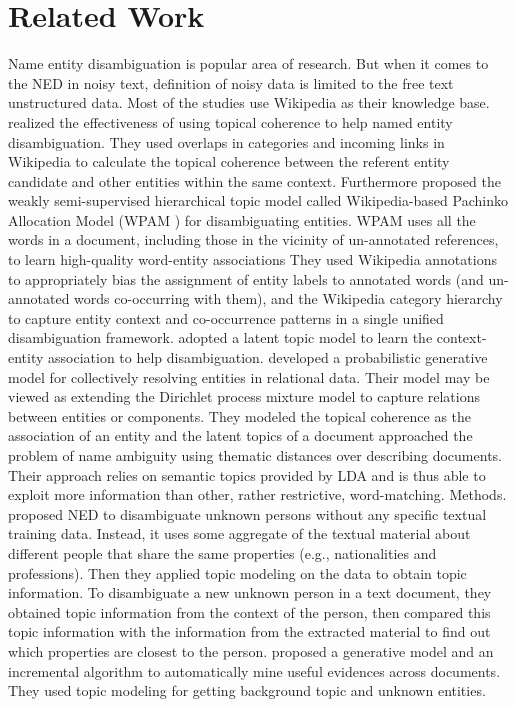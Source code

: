 \section{Related Work}
Name entity disambiguation is popular area of research. But when it comes to the NED in noisy text, definition of noisy data is limited to the free text unstructured data. Most of the studies use Wikipedia as their knowledge base. ~\cite{cucerzan2007large} realized the effectiveness of using topical coherence to help named entity disambiguation. They used overlaps in categories and incoming links in Wikipedia to calculate the topical coherence between the referent entity candidate and other entities within the same context. Furthermore \cite{kataria2011entit} proposed the weakly semi-supervised hierarchical topic model called Wikipedia-based Pachinko Allocation Model (WPAM ) for disambiguating entities. WPAM uses all the words in a document, including those in the vicinity of un-annotated references, to learn high-quality word-entity associations They used Wikipedia annotations to appropriately bias the assignment of entity labels to annotated words (and un-annotated words co-occurring with them), and the Wikipedia category hierarchy to capture entity context and co-occurrence patterns in a single unified disambiguation framework. \cite{sen2012collective} adopted a latent topic model to learn the context-entity association to help disambiguation.
\cite{bhattacharya2006latent} developed a probabilistic generative model for collectively resolving entities in relational data. Their model may be viewed as extending the Dirichlet process mixture model to capture relations between entities or components. They modeled the topical coherence as the association of an entity and the latent topics of a document \cite{pilz2011names} approached the problem of name ambiguity using thematic distances over describing documents. Their approach relies on semantic topics provided by LDA and is thus able to exploit more information than other, rather restrictive, word-matching. Methods. \cite{glaser2016named} proposed NED to disambiguate unknown persons without any specific textual training data. Instead, it uses some aggregate of the textual material about different people that share the same properties (e.g., nationalities and professions). Then they applied topic modeling on the data to obtain topic information. To disambiguate a new unknown person in a text document, they obtained topic information from the context of the person, then compared this topic information with the information from the extracted material to find out which properties are closest to the person. \cite{Li:2013} proposed a generative model and an incremental algorithm to automatically mine useful evidences across documents. They used topic modeling for getting background topic and unknown entities.
